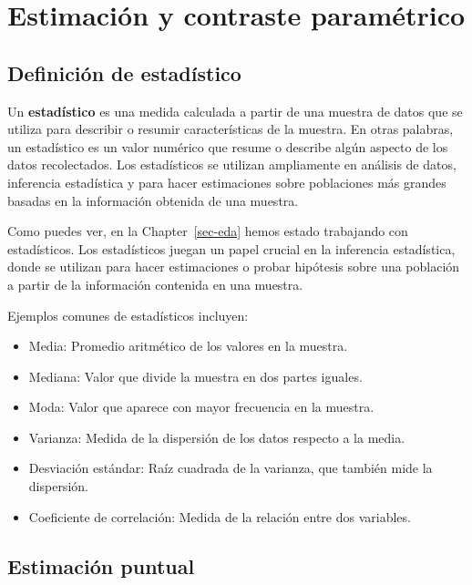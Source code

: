 \documentclass[
  letterpaper,
  DIV=11,
  numbers=noendperiod]{scrreprt}
\providecommand{\tightlist}{%
  \setlength{\itemsep}{0pt}\setlength{\parskip}{0pt}}\usepackage{longtable,booktabs,array}
\begin{document}

\hypertarget{sec-para}{%
\chapter{Estimación y contraste paramétrico}\label{sec-para}}

\hypertarget{definiciuxf3n-de-estaduxedstico}{%
\section{Definición de
estadístico}\label{definiciuxf3n-de-estaduxedstico}}

Un \textbf{estadístico} es una medida calculada a partir de una muestra
de datos que se utiliza para describir o resumir características de la
muestra. En otras palabras, un estadístico es un valor numérico que
resume o describe algún aspecto de los datos recolectados. Los
estadísticos se utilizan ampliamente en análisis de datos, inferencia
estadística y para hacer estimaciones sobre poblaciones más grandes
basadas en la información obtenida de una muestra.

Como puedes ver, en la Chapter~\ref{sec-eda} hemos estado trabajando con
estadísticos. Los estadísticos juegan un papel crucial en la inferencia
estadística, donde se utilizan para hacer estimaciones o probar
hipótesis sobre una población a partir de la información contenida en
una muestra.

Ejemplos comunes de estadísticos incluyen:

\begin{itemize}
\tightlist
\item
  Media: Promedio aritmético de los valores en la muestra.
\item
  Mediana: Valor que divide la muestra en dos partes iguales.
\item
  Moda: Valor que aparece con mayor frecuencia en la muestra.
\item
  Varianza: Medida de la dispersión de los datos respecto a la media.
\item
  Desviación estándar: Raíz cuadrada de la varianza, que también mide la
  dispersión.
\item
  Coeficiente de correlación: Medida de la relación entre dos variables.
\end{itemize}

\hypertarget{estimaciuxf3n-puntual-1}{%
\section{Estimación puntual}\label{estimaciuxf3n-puntual-1}}
\end{document}
